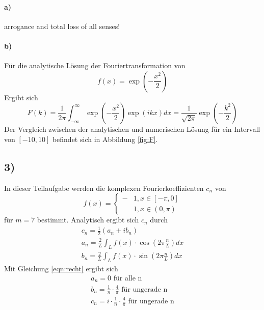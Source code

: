 \paragraph*{a)}
arrogance and total loss of all senses!
\paragraph*{b)}
Für die analytische Lösung der Fouriertransformation von 
\begin{equation}
    f(x) = \exp{\left( - \frac{x^2}{2} \right)}
\end{equation}
Ergibt sich 
\begin{equation}
    F(k) = \frac{1}{2\pi} \int_{-\infty}^{\infty} \exp{\left( - \frac{x^2}{2} \right)} \exp{\left(i k x \right) } dx = \frac{1}{\sqrt{2 \pi}} \exp{\left( - \frac{k^2}{2} \right)}
\end{equation}
Der Vergleich zwischen der analytischen und numerischen Lösung für ein Intervall von $\left[-10, 10\right]$ befindet sich in Abbildung \ref{fig:F}.

\subsection*{3)}
In dieser Teilaufgabe werden die komplexen Fourierkoeffizienten $c_n$ von 
\begin{equation}
    f(x) = \begin{cases}
        -&1, x \in \left[ - \pi, 0\right] \\
         &1, x \in \left(0 , \pi\right)
    \end{cases}
    \label{eqn:recht}
\end{equation}
für $ m = 7 $ bestimmt. 
Analytisch ergibt sich $c_n$ durch 
\begin{align}
    c_n = \frac{1}{2} \left( a_n + i b_n \right) \\
    a_n = \frac{2}{L} \int_L f(x) \cdot \cos(  2\pi \frac{n}{L}) dx \\
    b_n = \frac{2}{L} \int_L f(x) \cdot \sin(  2\pi \frac{n}{L}) dx
\end{align}
Mit Gleichung \eqref{eqn:recht} ergibt sich 
\begin{align}
    a_n = 0 \text{  für alle n} \\
    b_n = \frac{1}{n} \cdot \frac{4}{\pi} \text{    für ungerade n} \\
    c_n = i \cdot \frac{1}{n} \cdot \frac{4}{\pi} \text{    für ungerade n}
\end{align}
